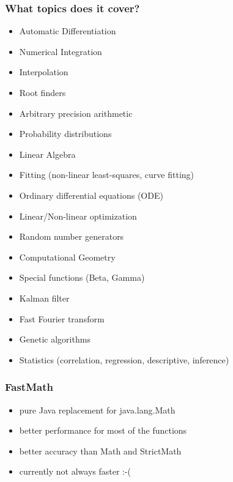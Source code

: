 \documentclass[10pt,mathserif]{beamer}
\begin{document}
\begin{frame}
  \frametitle{What topics does it cover?}


\begin{small}
\begin{itemize}
  \item Automatic Differentiation
  \item Numerical Integration
  \item Interpolation
  \item Root finders
  \item Arbitrary precision arithmetic
  \item Probability distributions
  \item Linear Algebra
  \item Fitting (non-linear least-squares, curve fitting)
  \item Ordinary differential equations (ODE)
  \item Linear/Non-linear optimization
  \item Random number generators
  \item Computational Geometry
  \item Special functions (Beta, Gamma)
  \item Kalman filter
  \item Fast Fourier transform
  \item Genetic algorithms
  \item Statistics (correlation, regression, descriptive, inference)
\end{itemize}
\end{small}
\end{frame}

\begin{frame}
  \frametitle{FastMath}

\begin{itemize}
  \item pure Java replacement for java.lang.Math
  \item better performance for most of the functions
  \item better accuracy than Math and StrictMath
  \item currently not always faster :-(
\end{itemize}

\end{frame}
\end{document}
